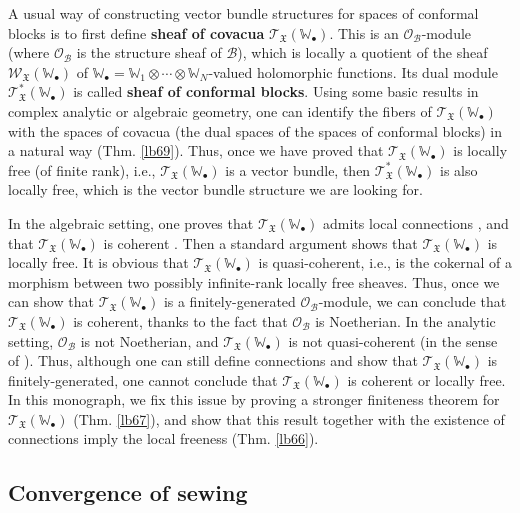 \documentclass[12pt,a4paper,notitlepage]{report}
\theoremstyle{definition}
\theoremstyle{plain}
\newcommand{\fk}{\mathfrak}
\newcommand{\mc}{\mathcal}
\newcommand{\scr}{\mathscr}
\newcommand{\blt}{\bullet}
\newcommand{\Wbb}{\mathbb W}
\numberwithin{equation}{section}
\begin{document}
	
A usual way of constructing vector bundle structures for spaces of conformal blocks is to first define \textbf{sheaf of covacua} $\scr T_{\fk X}(\Wbb_\blt)$. This is an $\scr O_{\mc B}$-module (where $\scr O_{\mc B}$ is the structure sheaf of $\mc B$), which is locally a quotient of the sheaf $\scr W_{\fk X}(\Wbb_\blt)$ of $\Wbb_\blt=\Wbb_1\otimes\cdots\otimes\Wbb_N$-valued holomorphic functions. Its dual module $\scr T_{\fk X}^*(\Wbb_\blt)$ is called \textbf{sheaf of conformal blocks}. Using some basic results in complex analytic or algebraic geometry, one can identify the fibers of $\scr T_{\fk X}(\Wbb_\blt)$ with the spaces of covacua (the dual spaces of the spaces of conformal blocks) in a natural way (Thm. \ref{lb69}). Thus, once we have proved that $\scr T_{\fk X}(\Wbb_\blt)$ is locally free (of finite rank), i.e., $\scr T_{\fk X}(\Wbb_\blt)$ is a vector bundle, then $\scr T_{\fk X}^*(\Wbb_\blt)$ is also locally free, which is the vector bundle structure we are looking for. 

In the algebraic setting, one proves  that $\scr T_{\fk X}(\Wbb_\blt)$ admits  local connections \cite{FB04,DGT19a}, and that $\scr T_{\fk X}(\Wbb_\blt)$ is coherent \cite{DGT19b}. Then a standard argument shows that $\scr T_{\fk X}(\Wbb_\blt)$ is locally free. It is obvious that $\scr T_{\fk X}(\Wbb_\blt)$ is quasi-coherent, i.e., is the cokernal of a morphism between two possibly infinite-rank locally free sheaves. Thus, once we can show that $\scr T_{\fk X}(\Wbb_\blt)$ is a finitely-generated $\scr O_{\mc B}$-module, we can conclude that $\scr T_{\fk X}(\Wbb_\blt)$ is coherent, thanks to the fact that $\scr O_{\mc B}$ is Noetherian.  In the analytic setting, $\scr O_{\mc B}$ is not Noetherian, and $\scr T_{\fk X}(\Wbb_\blt)$ is not quasi-coherent (in the sense of \cite{EP96}). Thus, although one can still define connections and show that $\scr T_{\fk X}(\Wbb_\blt)$ is finitely-generated, one cannot conclude that $\scr T_{\fk X}(\Wbb_\blt)$ is coherent or locally free. In this monograph, we fix this issue by proving a stronger finiteness theorem for $\scr T_{\fk X}(\Wbb_\blt)$ (Thm. \ref{lb67}), and show that this result together with the existence of connections imply the local freeness (Thm. \ref{lb66}).
	



\subsection*{Convergence of sewing}
\end{document}
